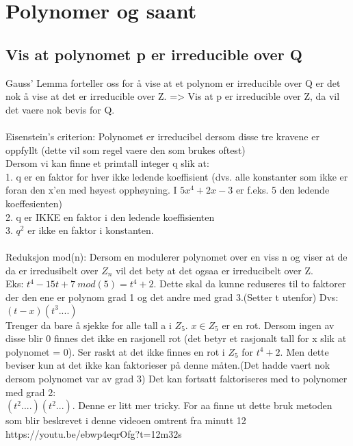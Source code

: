 \documentclass[12pt,a4paper]{article}
\begin{document}
\section*{Polynomer og saant}

\subsection*{Vis at polynomet p er irreducible over Q}
Gauss' Lemma forteller oss for å vise at et polynom er irreducible over Q er det nok å vise at det er irreducible over Z. => Vis at p er irreducible over Z, da vil det vaere nok bevis for Q.
\\\\
Eisenstein's criterion: Polynomet er irreducibel dersom disse tre kravene er oppfyllt (dette vil som regel vaere den som brukes oftest)\\
Dersom vi kan finne et primtall integer q slik at:\\
1. q er en faktor for hver ikke ledende koeffisient (dvs. alle konstanter som ikke er foran den x'en med høyest opphøyning. I $5x^4 +2x -3$ er f.eks. 5 den ledende koeffesienten)\\
2. q er IKKE en faktor i den ledende koeffisienten\\
3. $q^2$ er ikke en faktor i konstanten. \\\\

Reduksjon mod(n): Dersom en modulerer polynomet over en viss n og viser at de da er irredusibelt over $Z_n$ vil det bety at det ogsaa er irreducibelt over Z.\\
Eks: $t^4 - 15t + 7\ mod(5) = t^4 + 2$. Dette skal da kunne reduseres til to faktorer der den ene er polynom grad 1 og det andre med grad 3.(Setter t utenfor) Dvs: $(t-x)(t^3 ....)$\\
Trenger da bare å sjekke for alle tall a i $Z_5$. $x\in Z_5$ er en rot. Dersom ingen av disse blir 0 finnes det ikke en rasjonell rot (det betyr et rasjonalt tall for x slik at polynomet = 0). Ser raskt at det ikke finnes en rot i $Z_5$ for $t^4 + 2$. Men dette beviser kun at det ikke kan faktorieser på denne måten.(Det hadde vaert nok dersom polynomet var av grad 3) Det kan fortsatt faktoriseres med to polynomer med grad 2: \\
$(t^2....)(t^2...)$. Denne er litt mer tricky. For aa finne ut dette bruk metoden som blir beskrevet i denne videoen omtrent fra minutt 12\\
https://youtu.be/ebwp4eqrOfg?t=12m32s
\end{document}
